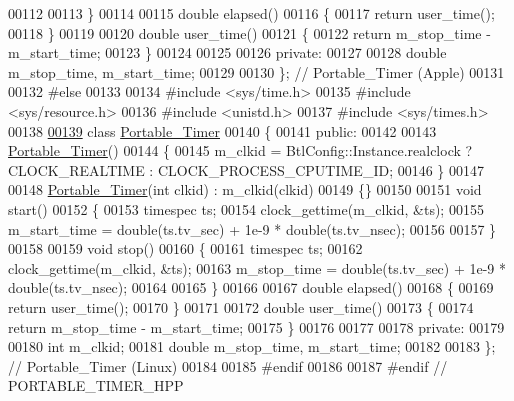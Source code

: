 \begin{DoxyCode}
00112 
00113   \}
00114 
00115   \textcolor{keywordtype}{double} elapsed()
00116   \{
00117     \textcolor{keywordflow}{return}  user\_time();
00118   \}
00119 
00120   \textcolor{keywordtype}{double} user\_time()
00121   \{
00122     \textcolor{keywordflow}{return} m\_stop\_time - m\_start\_time;
00123   \}
00124 
00125 
00126 \textcolor{keyword}{private}:
00127 
00128   \textcolor{keywordtype}{double} m\_stop\_time, m\_start\_time;
00129 
00130 \}; \textcolor{comment}{// Portable\_Timer (Apple)}
00131 
00132 \textcolor{preprocessor}{#else}
00133 
00134 \textcolor{preprocessor}{#include <sys/time.h>}
00135 \textcolor{preprocessor}{#include <sys/resource.h>}
00136 \textcolor{preprocessor}{#include <unistd.h>}
00137 \textcolor{preprocessor}{#include <sys/times.h>}
00138 
\hyperlink{class_portable___timer}{00139} \textcolor{keyword}{class }\hyperlink{class_portable___timer}{Portable\_Timer}
00140 \{
00141  \textcolor{keyword}{public}:
00142 
00143   \hyperlink{class_portable___timer}{Portable\_Timer}()
00144   \{
00145     m\_clkid = BtlConfig::Instance.realclock ? CLOCK\_REALTIME : CLOCK\_PROCESS\_CPUTIME\_ID;
00146   \}
00147 
00148   \hyperlink{class_portable___timer}{Portable\_Timer}(\textcolor{keywordtype}{int} clkid) : m\_clkid(clkid)
00149   \{\}
00150 
00151   \textcolor{keywordtype}{void} start()
00152   \{
00153     timespec ts;
00154     clock\_gettime(m\_clkid, &ts);
00155     m\_start\_time = double(ts.tv\_sec) + 1e-9 * double(ts.tv\_nsec);
00156 
00157   \}
00158 
00159   \textcolor{keywordtype}{void} stop()
00160   \{
00161     timespec ts;
00162     clock\_gettime(m\_clkid, &ts);
00163     m\_stop\_time = double(ts.tv\_sec) + 1e-9 * double(ts.tv\_nsec);
00164 
00165   \}
00166 
00167   \textcolor{keywordtype}{double} elapsed()
00168   \{
00169     \textcolor{keywordflow}{return}  user\_time();
00170   \}
00171 
00172   \textcolor{keywordtype}{double} user\_time()
00173   \{
00174     \textcolor{keywordflow}{return} m\_stop\_time - m\_start\_time;
00175   \}
00176 
00177 
00178 \textcolor{keyword}{private}:
00179 
00180   \textcolor{keywordtype}{int} m\_clkid;
00181   \textcolor{keywordtype}{double} m\_stop\_time, m\_start\_time;
00182 
00183 \}; \textcolor{comment}{// Portable\_Timer (Linux)}
00184 
00185 \textcolor{preprocessor}{#endif}
00186 
00187 \textcolor{preprocessor}{#endif  // PORTABLE\_TIMER\_HPP}
\end{DoxyCode}
